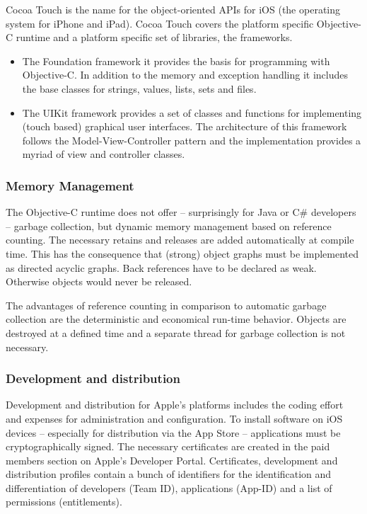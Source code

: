 Cocoa Touch is the name for the object-oriented APIs for iOS (the operating system for iPhone and iPad). 
Cocoa Touch covers the platform specific Objective-C runtime and a platform specific set of libraries, the frameworks.

\begin{itemize}
\item The Foundation framework it provides the basis for programming with Objective-C. 
In addition to the memory and exception handling it includes the base classes for strings, values, lists, sets and files.
\item The UIKit framework provides a set of classes and functions for implementing (touch based) graphical user interfaces. 
The architecture of this framework follows the Model-View-Controller pattern 
and the implementation provides a myriad of view and controller classes.
\end{itemize}

\subsubsection{Memory Management}
\label{sec:MemoryManagement}
The Objective-C runtime does not offer – surprisingly for Java or C\# developers  – garbage collection, 
but dynamic memory management based on reference counting. 
The necessary retains and releases are added automatically at compile time.
This has the consequence that (strong) object graphs must be implemented as directed acyclic graphs. 
Back references have to be declared as weak.
Otherwise objects would never be released. 

The advantages of reference counting in comparison to automatic garbage collection 
are the deterministic and economical run-time behavior.
Objects are destroyed at a defined time and a separate thread for garbage collection is not necessary. 


\subsubsection{Development and distribution}
\label{sec:DAD}
Development and distribution for Apple's platforms includes the coding effort and expenses for administration and configuration. 
To install software on iOS devices – especially for distribution via the App Store – applications must be cryptographically signed. 
The necessary certificates are created in the paid members section on Apple's Developer Portal. 
Certificates, development and distribution profiles contain a bunch of identifiers for the identification and differentiation of developers (Team ID), 
applications (App-ID) and a list of permissions (entitlements). 


